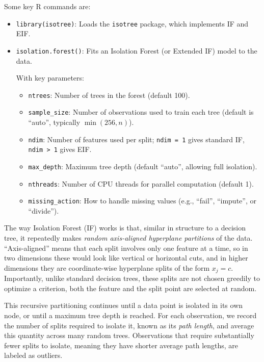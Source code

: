 \medskip

Some key R commands are:
\begin{itemize}
    \item \texttt{library(isotree)}: Loads the \texttt{isotree} package, which implements IF and EIF.

    \item \texttt{isolation.forest()}: Fits an Isolation Forest (or Extended IF) model to the data.

    With key parameters:
    \begin{itemize}[label=$\circ$, itemsep=0.3em]
        \item \texttt{ntrees}: Number of trees in the forest (default 100).
        \item \texttt{sample\_size}: Number of observations used to train each tree (default is ``auto'', typically $\min(256, n)$).
        \item \texttt{ndim}: Number of features used per split; \texttt{ndim = 1} gives standard IF, \texttt{ndim > 1} gives EIF.
        \item \texttt{max\_depth}: Maximum tree depth (default ``auto'', allowing full isolation).
        \item \texttt{nthreads}: Number of CPU threads for parallel computation (default 1).
        \item \texttt{missing\_action}: How to handle missing values (e.g., ``fail'', ``impute'', or ``divide'').
    \end{itemize}
\end{itemize}

\medskip


The way Isolation Forest (IF) works is that, similar in structure to a decision tree, it repeatedly makes \textit{random axis-aligned hyperplane partitions} of the data. “Axis-aligned” means that each split involves only one feature at a time, so in two dimensions these would look like vertical or horizontal cuts, and in higher dimensions they are coordinate-wise hyperplane splits of the form $x_j=c$. Importantly, unlike standard decision trees, these splits are not chosen greedily to optimize a criterion, both the feature and the split point are selected at random.

This recursive partitioning continues until a data point is isolated in its own node, or until a maximum tree depth is reached. For each observation, we record the number of splits required to isolate it, known as its \textit{path length}, and average this quantity across many random trees. Observations that require substantially fewer splits to isolate, meaning they have shorter average path lengths, are labeled as outliers.

